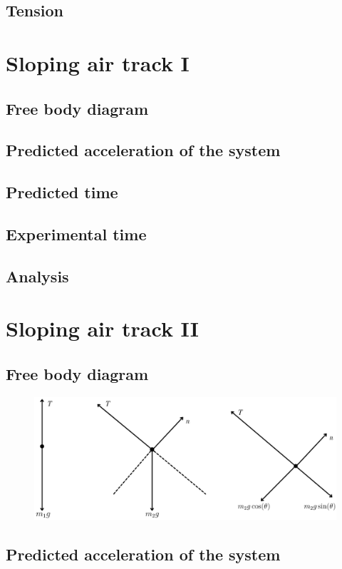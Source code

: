 \documentclass[11pt, letterpaper, includehead]{article}
\begin{document}
\subsection{Tension} %
\section{Sloping air track I} %
\subsection{Free body diagram}
\subsection{Predicted acceleration of the system}
\subsection{Predicted time}
\subsection{Experimental time}
\subsection{Analysis}


\section{Sloping air track II} %
\subsection{Free body diagram}
\begin{figure}[H] %
  \centering 
  \includegraphics[width=15cm]{part_3.png}
\end{figure}

\subsection{Predicted acceleration of the system}
\end{document}
